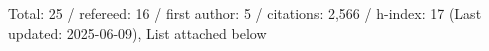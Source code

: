 Total: 25 / refereed: 16 / first author: 5 / citations: 2,566 / h-index: 17 (Last updated: 2025-06-09), List attached below